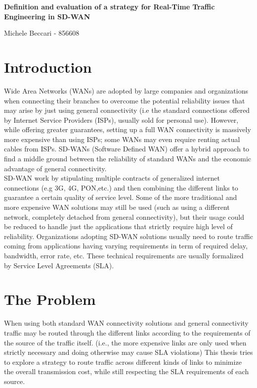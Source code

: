\documentclass{article}
\begin{document}
	\begin{center}
	\vspace*{1cm}
	
	\textbf{\Large Definition and evaluation of a strategy for Real-Time Traffic Engineering in SD-WAN ​
	}
	\end{center}
	

 	\begin{center}
 		Michele Beccari - 856608
 	\end{center}

	\section{Introduction}
	Wide Area Networks (WANs) are adopted by large companies and organizations when connecting their branches to overcome the
	potential reliability issues that may arise by just using general connectivity (i.e the standard
	connections offered by Internet Service Providers (ISPs), usually sold for personal use).
	However, while offering greater guarantees, setting up a full WAN connectivity is massively more
	expensive than using ISPs; some WANs may even require renting actual cables from ISPs. SD-WANs
	(Software Defined WAN) offer a hybrid approach to find a middle ground between the reliability of
	standard WANs and the economic advantage of general connectivity. \\
	SD-WAN work by stipulating multiple contracts of generalized internet connections (e.g 3G, 4G, PON,etc.) and then combining the different links to guarantee a certain quality of service level. Some of the more traditional and more expensive WAN solutions may still be used (such as using a different network, completely detached from general connectivity), but their usage could be reduced to handle just the applications that strictly require high level of reliability.
	Organizations adopting SD-WAN solutions usually need to route traffic coming from applications having varying requirements in term of required delay, bandwidth, error rate, etc.
	These technical requirements are usually formalized by Service Level Agreements (SLA). \\

	
	\section{The Problem}
	When using both standard WAN connectivity solutions and general connectivity traffic may be routed
	through the different links according to the requirements of the source of the traffic itself. (i.e.,  the
	more expensive links are only used when strictly necessary and doing otherwise may cause SLA violations)
	This thesis tries to explore a strategy to route traffic across different kinds of links to minimize the
	overall transmission cost, while still respecting the SLA requirements of each source. 
	
\end{document}
